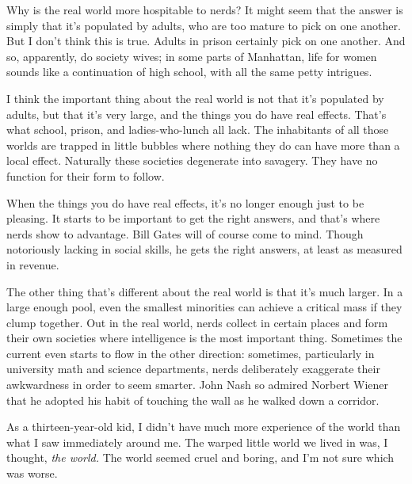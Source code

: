                   Why is the real world more hospitable to nerds? It might seem
                  that the answer is simply that it's populated by adults, who
                  are too mature to pick on one another. But I don't think this
                  is true. Adults in prison certainly pick on one another. And
                  so, apparently, do society wives; in some parts of Manhattan,
                  life for women sounds like a continuation of high school, with
                  all the same petty intrigues.

I think the important
                  thing about the real world is not that it's populated by
                  adults, but that it's very large, and the things you do have
                  real effects. That's what school, prison, and ladies-who-lunch
                  all lack. The inhabitants of all those worlds are trapped in
                  little bubbles where nothing they do can have more than a
                  local effect. Naturally these societies degenerate into
                  savagery. They have no function for their form to follow.

When
                  the things you do have real effects, it's no longer enough
                  just to be pleasing. It starts to be important to get the
                  right answers, and that's where nerds show to advantage. Bill
                  Gates will of course come to mind. Though notoriously lacking
                  in social skills, he gets the right answers, at least as
                  measured in revenue.

The other thing that's
                  different about the real world is that it's much larger. In a
                  large enough pool, even the smallest minorities can achieve a
                  critical mass if they clump together. Out in the real world,
                  nerds collect in certain places and form their own societies
                  where intelligence is the most important thing. Sometimes the
                  current even starts to flow in the other direction: sometimes,
                  particularly in university math and science departments, nerds
                  deliberately exaggerate their awkwardness in order to seem
                  smarter. John Nash so admired Norbert Wiener that he adopted
                  his habit of touching the wall as he walked down a
                  corridor.




                  As a thirteen-year-old kid, I didn't have much more experience
                  of the world than what I saw immediately around me. The warped
                  little world we lived in was, I thought, \emph{the world.} The
                  world seemed cruel and boring, and I'm not sure which was
                  worse.

